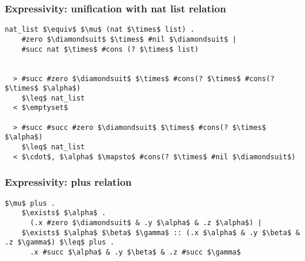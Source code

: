 \documentclass{beamer}
\begin{document}
\begin{frame}[fragile]
  \frametitle{Expressivity: unification with nat list relation}

  \begin{lstlisting}[]
  nat_list $\equiv$ $\mu$ (nat $\times$ list) .
    #zero $\diamondsuit$ $\times$ #nil $\diamondsuit$ | 
    #succ nat $\times$ #cons (? $\times$ list)


  > #succ #zero $\diamondsuit$ $\times$ #cons(? $\times$ #cons(? $\times$ $\alpha$) 
    $\leq$ nat_list
  < $\emptyset$

  > #succ #succ #zero $\diamondsuit$ $\times$ #cons(? $\times$ $\alpha$) 
    $\leq$ nat_list
  < $\cdot$, $\alpha$ $\mapsto$ #cons(? $\times$ #nil $\diamondsuit$)
  \end{lstlisting} 
\end{frame}


\begin{frame}[fragile]
  \frametitle{Expressivity: plus relation}

  \begin{lstlisting}[]
  $\mu$ plus .
    $\exists$ $\alpha$ . 
      (.x #zero $\diamondsuit$ & .y $\alpha$ & .z $\alpha$) |
    $\exists$ $\alpha$ $\beta$ $\gamma$ :: (.x $\alpha$ & .y $\beta$ & .z $\gamma$) $\leq$ plus . 
      .x #succ $\alpha$ & .y $\beta$ & .z #succ $\gamma$
  \end{lstlisting}
\end{frame}
\end{document}

